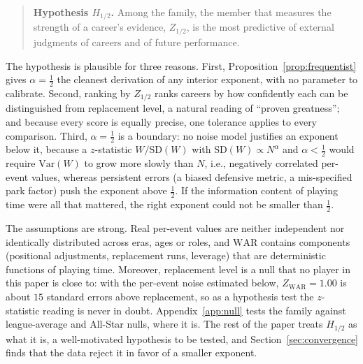 \documentclass[11pt,letterpaper]{article}
\theoremstyle{plain}
\theoremstyle{definition}
\theoremstyle{remark}
\newcommand{\WAR}{\mathrm{WAR}}
\newcommand{\ZWAR}{Z_{\WAR}}
\newcommand{\SD}{\mathrm{SD}}
\newcommand{\Var}{\mathrm{Var}}
\begin{document}
\begin{quote}
\textbf{Hypothesis $H_{1/2}$.} Among the family, the member that measures the strength of a career's evidence, $Z_{1/2}$, is the most predictive of external judgments of careers and of future performance.
\end{quote}

The hypothesis is plausible for three reasons. First, Proposition~\ref{prop:frequentist} gives $\alpha = \tfrac12$ the cleanest derivation of any interior exponent, with no parameter to calibrate. Second, ranking by $Z_{1/2}$ ranks careers by how confidently each can be distinguished from replacement level, a natural reading of ``proven greatness''; and because every score is equally precise, one tolerance applies to every comparison. Third, $\alpha = \tfrac12$ is a boundary: no noise model justifies an exponent below it, because a $z$-statistic $W/\SD(W)$ with $\SD(W) \propto N^{\alpha}$ and $\alpha < \tfrac12$ would require $\Var(W)$ to grow more slowly than $N$, i.e., negatively correlated per-event values, whereas persistent errors (a biased defensive metric, a mis-specified park factor) push the exponent above $\tfrac12$. If the information content of playing time were all that mattered, the right exponent could not be smaller than $\tfrac12$.

The assumptions are strong. Real per-event values are neither independent nor identically distributed across eras, ages or roles, and $\WAR$ contains components (positional adjustments, replacement runs, leverage) that are deterministic functions of playing time. Moreover, replacement level is a null that no player in this paper is close to: with the per-event noise estimated below, $\ZWAR = 1.00$ is about $15$ standard errors above replacement, so as a hypothesis test the $z$-statistic reading is never in doubt. Appendix~\ref{app:null} tests the family against league-average and All-Star nulls, where it is. The rest of the paper treats $H_{1/2}$ as what it is, a well-motivated hypothesis to be tested, and Section~\ref{sec:convergence} finds that the data reject it in favor of a smaller exponent.
\end{document}
